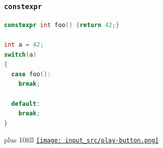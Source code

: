 \documentclass[C++.tex]{subfiles}
\begin{document}
\begin{frame}[fragile]
	\frametitle{\lstinline|constexpr|}
	\begin{lstlisting}[language=C++]
constexpr int foo() {return 42;}

int a = 42;
switch(a)
{
  case foo():
    break;

  default:
    break;
}\end{lstlisting}

	\vskip 10mm plus 10fill
	\hfill
	\href{https://godbolt.org/#g:!((g:!((g:!((h:codeEditor,i:(filename:'1',fontScale:14,fontUsePx:'0',j:1,lang:c%2B%2B,selection:(endColumn:1,endLineNumber:23,positionColumn:1,positionLineNumber:23,selectionStartColumn:1,selectionStartLineNumber:23,startColumn:1,startLineNumber:23),source:'%23include+%3Ciostream%3E%0A%0Astatic+constexpr+int+foo()%0A%7B%0A++return+42%3B%0A%7D%0A%0Aint+main()%0A%7B%0A++char+bar%5Bfoo()%5D+%3D+%22azerty%22%3B%0A%0A++int+a+%3D+42%3B%0A++switch(a)%0A++%7B%0A++++case+foo():%0A++++++std::cout+%3C%3C+bar+%3C%3C+!'%5Cn!'%3B%0A++++++break%3B%0A%0A++++default:%0A++++++break%3B%0A++%7D%0A%7D%0A'),l:'5',n:'0',o:'C%2B%2B+source+%231',t:'0')),k:50,l:'4',n:'0',o:'',s:0,t:'0'),(g:!((h:executor,i:(argsPanelShown:'1',compilationPanelShown:'0',compiler:g112,compilerOutShown:'0',execArgs:'',execStdin:'',fontScale:14,fontUsePx:'0',j:1,lang:c%2B%2B,libs:!((name:boost,ver:'175')),options:'-std%3Dc%2B%2B11',source:1,stdinPanelShown:'1',tree:'1',wrap:'0'),l:'5',n:'0',o:'Executor+x86-64+gcc+11.2+(C%2B%2B,+Editor+%231)',t:'0')),header:(),k:50,l:'4',n:'0',o:'',s:0,t:'0')),l:'2',n:'0',o:'',t:'0')),version:4}{\texttt{[image: input\_src/play-button.png]}}
\end{frame}
\end{document}
